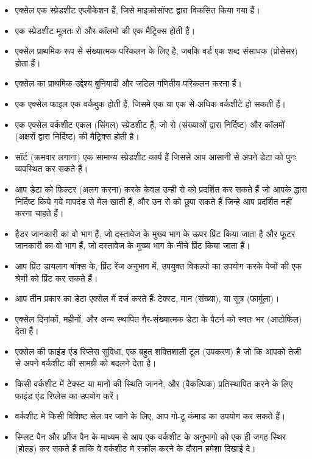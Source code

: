 \begin{itemize}[topsep=-1ex,parsep=0ex,partopsep=0ex,itemsep=0.5ex]
\item एक्सेल एक स्प्रेडशीट एप्लीकेशन हैं, जिसे माइक्रोसॉफ्ट द्वारा विकसित किया गया हैं।
\item एक स्प्रेडशीट मूलतः रो और कॉलमो की एक मैट्रिक्स होती हैं।
\item एक्सेल प्राथमिक रूप से संख्यात्मक परिकलन के लिए है, जबकि वर्ड एक शब्द संसाधक (प्रोसेसर) होता हैं।
\item एक्सेल का प्राथमिक उद्देश्य बुनियादी और जटिल गणितीय परिकलन करना हैं।
\item एक एक्सेल फाइल एक वर्कबुक होती हैं, जिसमे एक या एक से अधिक वर्कशीटे हो सकती हैं।
\item एक एक्सेल वर्कशीट एकल (सिंगल) स्प्रेडशीट हैं, जो रो (संख्याओं द्वारा निर्दिष्ट) और कॉलमों (अक्षरों द्वारा निर्दिष्ट) की मैट्रिक्स होती है।
\item सॉर्ट (क्रमवार लगाना) एक सामान्य स्प्रेडशीट कार्य हैं जिससे आप आसानी से अपने डेटा को पुनः व्यवस्थित कर सकते हैं।
\item आप डेटा को फिल्टर (अलग करना) करके केवल उन्ही रो को प्रदर्शित कर सकते हैं जो आपके द्धारा निर्दिष्ट किये गये मापदंड से मेल खाती हैं, और उन रो को छुपा सकते हैं जिन्हे आप प्रदर्शित नहीं करना चाहते हैं।
\item हैडर जानकारी का वो भाग हैं, जो दस्तावेज के मुख्य भाग के ऊपर प्रिंट किया जाता है और फूटर जानकारी का वो भाग हैं, जो दस्तावेज के मुख्य भाग के नीचे प्रिंट किया जाता हैं।
\item आप प्रिंट डायलाग बॉक्स के, प्रिंट रेंज अनुभाग में, उपयुक्त विकल्पो का उपयोग करके पेजों की एक श्रेणी को प्रिंट कर सकते हैं।
\item आप तीन प्रकार का डेटा एक्सेल में दर्ज करते हैंः टेक्स्ट, मान (संख्या), या सूत्र (फार्मूला)।
\item एक्सेल दिनांकों, महीनों, और अन्य स्थापित गैर-संख्यात्मक डेटा के पैटर्न को स्वतः भर (आटोफिल) देता हैं।
\item एक्सेल की फाइंड एंड रिप्लेस सुविधा, एक बहुत शक्तिशाली टूल (उपकरण) है जो कि आपको तेजी से अपने वर्कशीट की सामग्री को बदलने देता है।
\item किसी वर्कशीट में टेक्स्ट या मानों की स्थिति जानने, और (वैकल्पिक) प्रतिस्थापित करने के लिए फाइंड एंड रिप्लेस का उपयोग करें।
\item वर्कशीट मे किसी विशिष्ट सेल पर जाने के लिए, आप गो-टू कंमाड का उपयोग कर सकते हैं।
\item स्प्लिट पैन और फ्रीज पैन के माध्यम से आप एक वर्कशीट के अनुभागो को एक ही जगह स्थिर (होल्ड़) कर सकते हैं ताकि वे वर्कशीट मे स्क्रॉल करने के दौरान हमेशा दिखाई दे।
\end{itemize}

